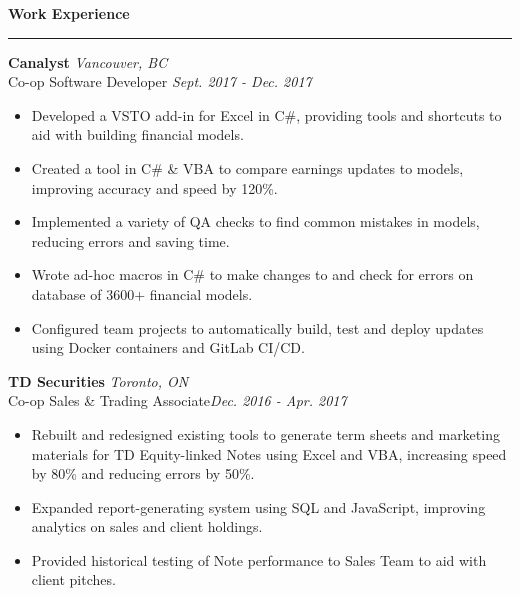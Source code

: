 \documentclass{letter}
\begin{document}
	\begin{flushleft}
		{\Large \textbf{Work Experience}}
		\rule[5pt]{\textwidth}{0.4pt}
		\vspace{-15pt}
		{\large\textbf{Canalyst}}  \hfill \textit{Vancouver, BC} \\
		\vspace{15pt}
		Co-op Software Developer \hfill \textit{Sept. 2017 - Dec. 2017}
		\vspace{-9pt}
		\begin{itemize}
			\item Developed a VSTO add-in for Excel in C\#, providing tools and shortcuts to aid with building financial models.\vspace{-3pt}
			\item Created a tool in C\# \& VBA to compare earnings updates to models, improving accuracy and speed by 120\%.\vspace{-3pt}
			\item Implemented a variety of QA checks to find common mistakes in models, reducing errors and saving time. \vspace{-3pt}
			\item Wrote ad-hoc macros in C\# to make changes to and check for errors on database of 3600+ financial models. \vspace{-3pt}
			\item Configured team projects to automatically build, test and deploy updates using Docker containers and GitLab CI/CD.
		\end{itemize}

		{\large\textbf{TD Securities}}  \hfill \textit{Toronto, ON} \\
		\vspace{1pt}
		Co-op Sales \& Trading Associate\hfill \textit{Dec. 2016 - Apr. 2017}
		\vspace{-9pt}
		\begin{itemize}
			\item Rebuilt and redesigned existing tools to generate term sheets and marketing materials for TD Equity-linked Notes using Excel and VBA, increasing speed by 80\% and reducing errors by 50\%. \vspace{-3pt}
			\item Expanded report-generating system using SQL and JavaScript, improving analytics on sales and client holdings. \vspace{-3pt}
			\item Provided historical testing of Note performance to Sales Team to aid with client pitches.
		\end{itemize}
	

\end{flushleft}
\end{document}
